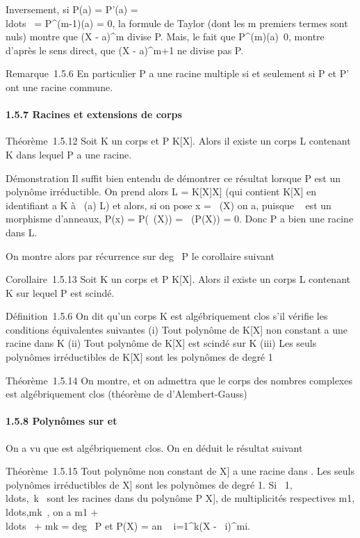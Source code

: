 Inversement, si P(a) = P'(a) =
\\ldots~ =
P^(m-1)(a) = 0, la formule de Taylor (dont les m premiers
termes sont nuls) montre que (X - a)^m divise P. Mais, le
fait que P^(m)(a)\neq~0, montre
d'après le sens direct, que (X - a)^m+1 ne divise pas P.

Remarque~1.5.6 En particulier P a une racine multiple si et seulement si
P et P' ont une racine commune.

\paragraph{1.5.7 Racines et extensions de corps}

Théorème~1.5.12 Soit K un corps et P \in K{[}X{]}. Alors il existe un
corps L contenant K dans lequel P a une racine.

Démonstration Il suffit bien entendu de démontrer ce résultat lorsque P
est un polynôme irréductible. On prend alors L = K{[}X{]}\diagupPK{[}X{]} (qui
contient K{[}X{]} en identifiant a \in K à \pi~(a) \in L) et alors, si on pose
x = \pi~(X) on a, puisque \pi~ est un morphisme d'anneaux, P(x) = P(\pi~(X)) =
\pi~(P(X)) = 0. Donc P a bien une racine dans L.

On montre alors par récurrence sur deg~ P le
corollaire suivant

Corollaire~1.5.13 Soit K un corps et P \in K{[}X{]}. Alors il existe un
corps L contenant K sur lequel P est scindé.

Définition~1.5.6 On dit qu'un corps K est algébriquement clos s'il
vérifie les conditions équivalentes suivantes (i) Tout polynôme de
K{[}X{]} non constant a une racine dans K (ii) Tout polynôme de K{[}X{]}
est scindé sur K (iii) Les seuls polynômes irréductibles de K{[}X{]}
sont les polynômes de degré 1

Théorème~1.5.14 On montre, et on admettra que le corps des nombres
complexes est algébriquement clos (théorème de d'Alembert-Gauss)

\paragraph{1.5.8 Polynômes sur  et ~}

On a vu que  est algébriquement clos. On en déduit le résultat suivant

Théorème~1.5.15 Tout polynôme non constant de \mathbb{C}{[}X{]} a une racine dans
. Les seuls polynômes irréductibles de \mathbb{C}{[}X{]} sont les polynômes de
degré 1. Si
\alpha~1,\\ldots,\alpha~k~
sont les racines dans  du polynôme P \in \mathbb{C}{[}X{]}, de multiplicités
respectives
m1,\\ldots,mk~,
on a m1 +
\\ldots~ +
mk = deg~ P et P(X) =
an \∏ ~
i=1^k(X - \alpha~i)^mi.

